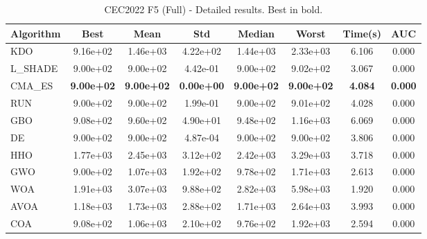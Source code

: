 \begin{table}[H]
\centering\small
\caption{CEC2022 F5 (Full) - Detailed results. Best in bold.}
\label{tab:cec2022_F5}
\begin{tabular}{lccccccc}
\toprule
\textbf{Algorithm} & \textbf{Best} & \textbf{Mean} & \textbf{Std} & \textbf{Median} & \textbf{Worst} & \textbf{Time(s)} & \textbf{AUC} \\
\midrule
KDO & 9.16e+02 & 1.46e+03 & 4.22e+02 & 1.44e+03 & 2.33e+03 & 6.106 & 0.000 \\
L_SHADE & 9.00e+02 & 9.00e+02 & 4.42e-01 & 9.00e+02 & 9.02e+02 & 3.067 & 0.000 \\
CMA_ES & \textbf{9.00e+02} & \textbf{9.00e+02} & \textbf{0.00e+00} & \textbf{9.00e+02} & \textbf{9.00e+02} & \textbf{4.084} & \textbf{0.000} \\
RUN & 9.00e+02 & 9.00e+02 & 1.99e-01 & 9.00e+02 & 9.01e+02 & 4.028 & 0.000 \\
GBO & 9.08e+02 & 9.60e+02 & 4.90e+01 & 9.48e+02 & 1.16e+03 & 6.069 & 0.000 \\
DE & 9.00e+02 & 9.00e+02 & 4.87e-04 & 9.00e+02 & 9.00e+02 & 3.806 & 0.000 \\
HHO & 1.77e+03 & 2.45e+03 & 3.12e+02 & 2.42e+03 & 3.29e+03 & 3.718 & 0.000 \\
GWO & 9.00e+02 & 1.07e+03 & 1.92e+02 & 9.78e+02 & 1.71e+03 & 2.613 & 0.000 \\
WOA & 1.91e+03 & 3.07e+03 & 9.88e+02 & 2.82e+03 & 5.98e+03 & 1.920 & 0.000 \\
AVOA & 1.18e+03 & 1.73e+03 & 2.88e+02 & 1.71e+03 & 2.64e+03 & 3.993 & 0.000 \\
COA & 9.08e+02 & 1.06e+03 & 2.10e+02 & 9.76e+02 & 1.92e+03 & 2.594 & 0.000 \\
\bottomrule
\end{tabular}
\end{table}
